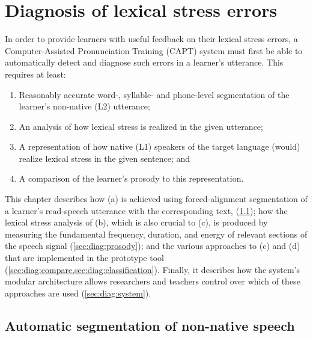 %
%
\chapter{Diagnosis of lexical stress errors}
\label{chap:diagnosis}


In order to provide learners with useful feedback on their lexical stress errors, %
a Computer-Assisted Pronunciation Training (CAPT) system
must first be able to automatically detect and diagnose such errors in a learner's utterance. This requires at least:
\begin{enumerate}[label=(\alph*),topsep=-.5em]
\item Reasonably accurate word-, syllable- and phone-level segmentation of the learner's non-native (L2) utterance; 
\item %
An analysis of how lexical stress is realized in the
given
utterance;
\item A representation of how native (L1) speakers of the target language (would) realize lexical stress in the given sentence; and
\item %
A comparison of the learner's prosody to this representation. 
\end{enumerate}

This chapter describes 
%
how (a) is achieved using
 forced-alignment segmentation of a learner's read-speech utterance with the corresponding text, 
 (\cref{sec:diag:segmentation}); 
 how the lexical stress analysis of (b), which is also crucial to (c), is produced by measuring the fundamental frequency, duration, and energy of relevant sections of the speech signal (\cref{sec:diag:prosody}); 
 and 
 the various approaches to (c) and (d) that are implemented in the prototype tool (\cref{sec:diag:compare,sec:diag:classification}).
 Finally, it describes how the system's modular architecture allows researchers and teachers control over which of these approaches are used (\cref{sec:diag:system}).



\section{Automatic segmentation of non-native speech}
\label{sec:diag:segmentation}

